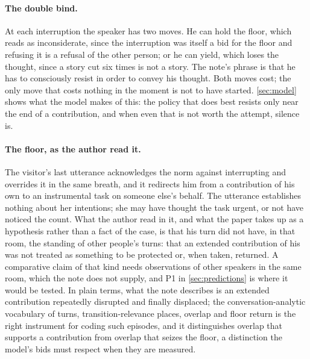 \paragraph{The double bind.} At each interruption the speaker has two moves. He can hold the floor, which reads as inconsiderate, since the interruption was itself a bid for the floor and refusing it is a refusal of the other person; or he can yield, which loses the thought, since a story cut six times is not a story. The note's phrase is that he has to consciously resist in order to convey his thought. Both moves cost; the only move that costs nothing in the moment is not to have started. \autoref{sec:model} shows what the model makes of this: the policy that does best resists only near the end of a contribution, and when even that is not worth the attempt, silence is.

\paragraph{The floor, as the author read it.} The visitor's last utterance acknowledges the norm against interrupting and overrides it in the same breath, and it redirects him from a contribution of his own to an instrumental task on someone else's behalf. The utterance establishes nothing about her intentions; she may have thought the task urgent, or not have noticed the count. What the author read in it, and what the paper takes up as a hypothesis rather than a fact of the case, is that his turn did not have, in that room, the standing of other people's turns: that an extended contribution of his was not treated as something to be protected or, when taken, returned. A comparative claim of that kind needs observations of other speakers in the same room, which the note does not supply, and P1 in \autoref{sec:predictions} is where it would be tested. In plain terms, what the note describes is an extended contribution repeatedly disrupted and finally displaced; the conversation-analytic vocabulary of turns, transition-relevance places, overlap and floor return \cite{Sacks1974} is the right instrument for coding such episodes, and it distinguishes overlap that supports a contribution from overlap that seizes the floor, a distinction the model's bids must respect when they are measured.

